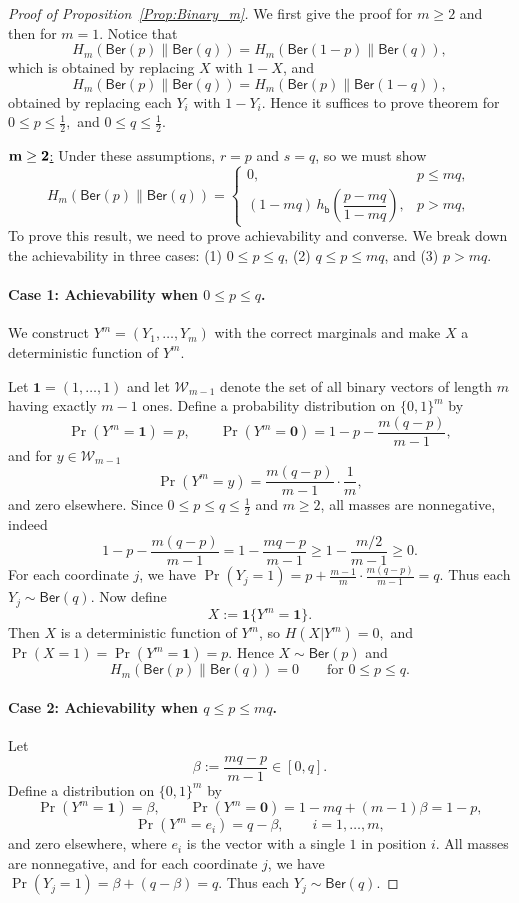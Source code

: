 \documentclass[journal]{IEEEtran}
\newcommand{\1}{\mathbf{1}}
\newcommand{\Ber}{\mathsf{Ber}}
\begin{document}
\begin{proof}[Proof of Proposition~\ref{Prop:Binary_m}]
We first give the proof for $m\geq 2$ and then for $m=1$. 
Notice that  
\[H_m(\Ber(p)\|\Ber(q)) =H_m(\Ber(1-p)\|\Ber(q)),\]
which is obtained by replacing $X$ with $1-X$, and
\[H_m(\Ber(p)\|\Ber(q))=H_m(\Ber(p)\|\Ber(1-q)),\]
obtained by replacing each $Y_i$ with $1-Y_i$. Hence it suffices to prove theorem for \(0\le p\le \tfrac12,\) and \(0\le q\le \tfrac12.\)



\noindent\underline{$\bf m\geq 2$:}
Under these assumptions, $r=p$ and $s=q$, so we must show
\[H_m(\Ber(p)\|\Ber(q))=\begin{cases}
0, & p\le mq,\\[1ex]
(1-mq)\,h_{\mathsf{b}}\!\left(\dfrac{p-mq}{1-mq}\right), & p>mq,
\end{cases}\]
To prove this result, we need to prove achievability and converse. We break down the achievability in three cases: (1) $0\le p\le q$, (2) $q\leq  p\le mq$, and (3) $p> mq$.

\paragraph{Case 1: Achievability when $0\le p\le q$.}
We construct $Y^m=(Y_1,\dots,Y_m)$ with the correct marginals and make $X$ a deterministic function of $Y^m$.

Let $\mathbf 1=(1,\dots,1)$ and let $\mathcal W_{m-1}$ denote the set of all binary vectors of length $m$ having exactly $m-1$ ones. Define a probability distribution on $\{0,1\}^m$ by
\[\Pr(Y^m=\mathbf 1)=p,\qquad \Pr(Y^m=\mathbf 0)=1-p-\frac{m(q-p)}{m-1},\]
and for $y\in\mathcal W_{m-1}$
\[\Pr(Y^m=y)=\frac{m(q-p)}{m-1}\cdot \frac1m,\]
and zero elsewhere.
Since $0\le p\le q\le \frac12$ and $m\ge 2$, all masses are nonnegative, indeed
\[1-p-\frac{m(q-p)}{m-1}=1-\frac{mq-p}{m-1} \ge 1-\frac{m/2}{m-1}\ge 0.\]
For each coordinate $j$, we have \(\Pr(Y_j=1)=p+\frac{m-1}{m}\cdot \frac{m(q-p)}{m-1}=q.\) Thus each $Y_j\sim \Ber(q)$.
Now define
\[X:=\mathbf 1\{Y^m=\mathbf 1\}.\]
Then $X$ is a deterministic function of $Y^m$, so \(H(X| Y^m)=0,\)
and \(\Pr(X=1)=\Pr(Y^m=\mathbf 1)=p.\)
Hence $X\sim\Ber(p)$ and
\[H_m(\Ber(p)\|\Ber(q))=0\qquad\text{for }0\le p\le q.\]

\paragraph{Case 2: Achievability when $q\le p\le mq$.}
Let
\[\beta:=\frac{mq-p}{m-1}\in[0,q].\]
Define a distribution on $\{0,1\}^m$ by
\[\Pr(Y^m=\mathbf 1)=\beta,\qquad \Pr(Y^m=\mathbf 0)=1-mq+(m-1)\beta=1-p,\]
\[\Pr(Y^m=e_i)=q-\beta,\qquad i=1,\dots,m,\]
and zero elsewhere, where $e_i$ is the vector with a single $1$ in position $i$.
All masses are nonnegative, and for each coordinate $j$, we have \(\Pr(Y_j=1)=\beta+(q-\beta)=q.\) Thus each $Y_j\sim\Ber(q)$.


\end{proof}
\end{document}
